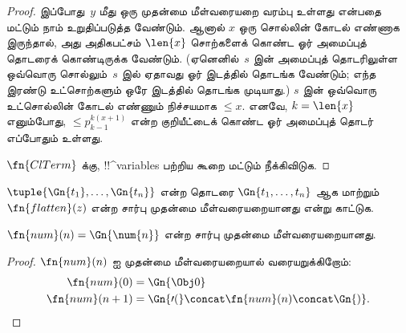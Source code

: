 \documentclass[../../../include/open-logic-section]{subfiles}
\begin{document}
\begin{proof}
இப்போது~$y$ மீது ஒரு முதன்மை மீள்வரையறை வரம்பு உள்ளது என்பதை மட்டும் நாம்
உறுதிப்படுத்த வேண்டும். ஆனால் $x$ ஒரு சொல்லின் கோடல் எண்ணாக இருந்தால், அது
அதிகபட்சம் $\len{x}$ சொற்களைக் கொண்ட ஓர் அமைப்புத் தொடரைக் கொண்டிருக்க
வேண்டும். (ஏனெனில்~$s$ இன் அமைப்புத் தொடரிலுள்ள ஒவ்வொரு சொல்லும்~$s$ இல்
ஏதாவது ஓர் இடத்தில் தொடங்க வேண்டும்; எந்த இரண்டு உட்சொற்களும் ஒரே இடத்தில்
தொடங்க முடியாது.) $s$ இன் ஒவ்வொரு உட்சொல்லின் கோடல் எண்ணும் நிச்சயமாக
$\le x$. எனவே, $k=\len{x}$ எனும்போது, $\le p_{k-1}^{k(x+1)}$ என்ற
குறியீட்டைக் கொண்ட ஓர் அமைப்புத் தொடர் எப்போதும் உள்ளது.

$\fn{ClTerm}$ க்கு, !!^{variable}s பற்றிய கூறை மட்டும் நீக்கிவிடுக.
\end{proof}

\begin{prob}
$\tuple{\Gn{t_1}, \dots, \Gn{t_n}}$ என்ற தொடரை $\Gn{t_1, \dots, t_n}$
ஆக மாற்றும் $\fn{flatten}(z)$ என்ற சார்பு முதன்மை மீள்வரையறையானது என்று
காட்டுக.
\end{prob}

\begin{prop}
  $\fn{num}(n) = \Gn{\num{n}}$ என்ற சார்பு முதன்மை மீள்வரையறையானது.
\end{prop}

\begin{proof}
  $\fn{num}(n)$ ஐ முதன்மை மீள்வரையறையால் வரையறுக்கிறோம்:
  \begin{align*}
    \fn{num}(0) & = \Gn{\Obj 0}\\
    \fn{num}(n+1) & = \Gn{\prime(} \concat \fn{num}(n) \concat \Gn{)}.
  \end{align*}
\end{proof}
\end{document}
